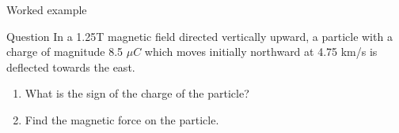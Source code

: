 
%
%

{
\problemslide

%
%
%

\begin{frame}{Worked example}

  \begin{blockexmplque}{Question}
    In a 1.25T magnetic field directed vertically upward,
    a particle with a charge of magnitude 8.5 ${\mu}C$ which moves initially
    northward at 4.75 km/s is deflected towards the east.
    \begin{enumerate}
       \item What is the sign of the charge of the particle?
       \item Find the magnetic force on the particle.
    \end{enumerate}
  \end{blockexmplque}


\end{frame}}
